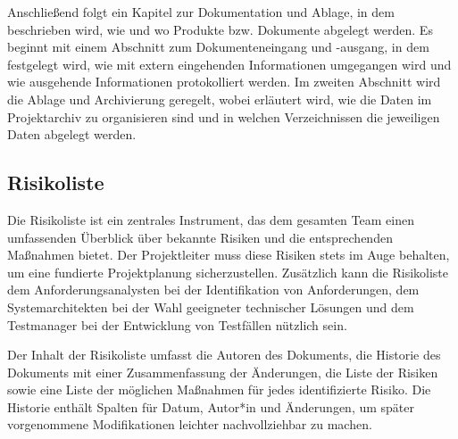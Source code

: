 

Anschließend folgt ein Kapitel zur Dokumentation und Ablage, in dem beschrieben wird, wie und wo Produkte bzw. 
Dokumente abgelegt werden. Es beginnt mit einem Abschnitt zum Dokumenteneingang und -ausgang, in dem festgelegt 
wird, wie mit extern eingehenden Informationen umgegangen wird und wie ausgehende Informationen protokolliert 
werden. Im zweiten Abschnitt wird die Ablage und Archivierung geregelt, wobei erläutert wird, wie die Daten im 
Projektarchiv zu organisieren sind und in welchen Verzeichnissen die jeweiligen Daten abgelegt werden.



\subsection{Risikoliste}  \label{Risikoliste}

Die Risikoliste ist ein zentrales Instrument, das dem gesamten Team einen umfassenden Überblick über bekannte Risiken 
und die entsprechenden Maßnahmen bietet. Der Projektleiter muss diese Risiken stets im Auge behalten, um eine 
fundierte Projektplanung sicherzustellen. Zusätzlich kann die Risikoliste dem Anforderungsanalysten bei der 
Identifikation von Anforderungen, dem Systemarchitekten bei der Wahl geeigneter technischer Lösungen und dem 
Testmanager bei der Entwicklung von Testfällen nützlich sein.

Der Inhalt der Risikoliste umfasst die Autoren des Dokuments, die Historie des Dokuments mit einer Zusammenfassung 
der Änderungen, die Liste der Risiken sowie eine Liste der möglichen Maßnahmen für jedes identifizierte Risiko. 
Die Historie enthält Spalten für Datum, Autor*in und Änderungen, um später vorgenommene Modifikationen leichter 
nachvollziehbar zu machen.

